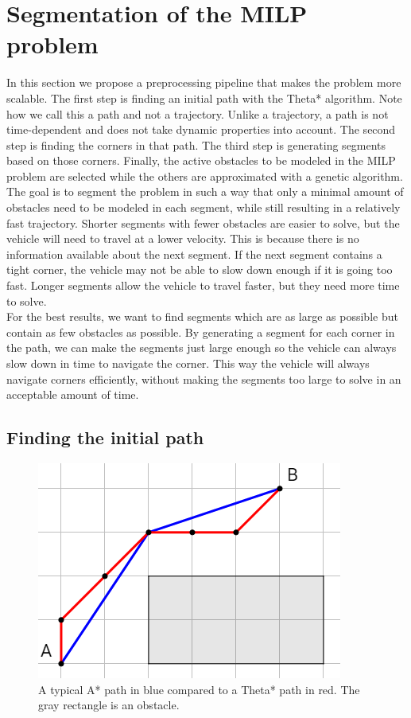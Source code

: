 \section{Segmentation of the MILP problem}
\label{section:segment}
In this section we propose a preprocessing pipeline that makes the problem more scalable. The first step is finding an initial path with the Theta* algorithm. Note how we call this a path and not a trajectory. Unlike a trajectory, a path is not time-dependent and does not take dynamic properties into account. The second step is finding the corners in that path. The third step is generating segments based on those corners. Finally, the active obstacles to be modeled in the MILP problem are selected while the others are approximated with a genetic algorithm. \\
The goal is to segment the problem in such a way that only a minimal amount of obstacles need to be modeled in each segment, while still resulting in a relatively fast trajectory. Shorter segments with fewer obstacles are easier to solve, but the vehicle will need to travel at a lower velocity. This is because there is no information available about the next segment. If the next segment contains a tight corner, the vehicle may not be able to slow down enough if it is going too fast. Longer segments allow the vehicle to travel faster, but they need more time to solve.\\
For the best results, we want to find segments which are as large as possible but contain as few obstacles as possible. By generating a segment for each corner in the path, we can make the segments just large enough so the vehicle can always slow down in time to navigate the corner. This way the vehicle will always navigate corners  efficiently, without making the segments too large to solve in an acceptable amount of time.
\subsection{Finding the initial path}


\begin{figure}
    \centering
        \includegraphics[width=0.6\columnwidth]{img/a_theta_star_comp2}
    \caption{A typical A* path in blue compared to a Theta* path in red. The gray rectangle is an obstacle.}\label{fig:pre-comp}
\end{figure}

